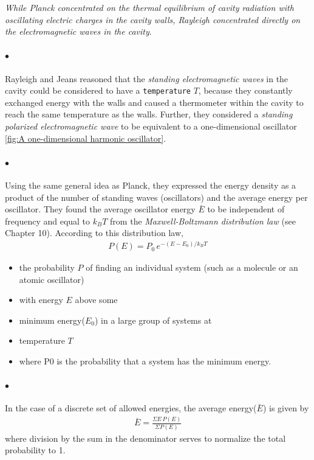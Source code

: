     \textit{While Planck concentrated on the thermal equilibrium of cavity radiation with oscillating electric charges in 
    the cavity walls, Rayleigh concentrated directly on the electromagnetic waves in the cavity}. 
    \paragraph{\color{c3}$\bullet$}Rayleigh and Jeans 
    reasoned that the \textit{standing electromagnetic waves} in the cavity could be considered to have a \texttt{temperature} $T$, 
    because they constantly exchanged energy with the walls and caused a thermometer within the cavity to reach 
    the same temperature as the walls. Further, they considered a \textit{standing polarized electromagnetic wave} to be 
    equivalent to a one-dimensional oscillator \eqref{fig:A one-dimensional harmonic oscillator}. 

    \paragraph{\color{c3}$\bullet$}Using the same general idea as Planck, they expressed 
    the energy density as a product of the number of standing waves (oscillators) and the average energy per 
    oscillator. They found the average oscillator energy $\bar{E}$ to be independent of frequency and equal to $k_B T$ from 
    the \textit{Maxwell-Boltzmann distribution law} (see Chapter 10). According to this distribution law, 
    \begin{align}
        \label{eq:probability of finding a system}
        P(E) = P_0\, e^{-(E-E_0)/k_B T}
    \end{align}
    {\tiny \begin{itemize}
        \item the probability $P$ of finding an individual system (such as a molecule or an atomic oscillator) 
        \item with energy $E$ above some  
        \item minimum energy($E_0$) in a large group of systems at 
        \item temperature $T$
        \item where P0 is the probability that a system has the minimum energy.
    \end{itemize}}
    
    \paragraph{\color{c3}$\bullet$} In the case of a discrete set of allowed energies, the average energy($\bar{E}$) is given by
    \begin{align}
        \label{eq:average energy}
        \bar{E} = \frac{\Sigma E\, P(E)}{\Sigma P(E)}
    \end{align}
    where division by the sum in the denominator serves to normalize the total probability to 1.

